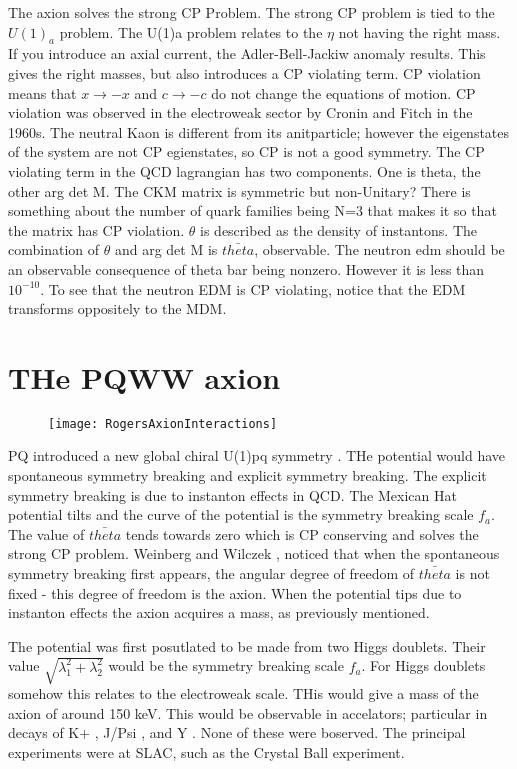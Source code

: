 \documentclass[12pt, twoside]{book}
\begin{document}
The axion solves the strong CP Problem.
The strong CP problem is tied to the $U(1)_a$ problem.
The U(1)a problem relates to the $\eta$ not having the right mass.
If you introduce an axial current, the Adler-Bell-Jackiw anomaly results.
This gives the right masses, but also introduces a CP violating term.
CP violation means that $x \rightarrow -x$ and $c \rightarrow -c$ do not change the equations of motion.
CP violation was observed in the electroweak sector by Cronin and Fitch in the 1960s. The neutral Kaon is different from its anitparticle; however the eigenstates of the system are not CP egienstates, so CP is not a good symmetry.
The CP violating term in the QCD lagrangian has two components. One is theta, the other arg det M. The CKM matrix is symmetric but non-Unitary? There is something about the number of quark families being N=3 that makes it so that the matrix has CP violation.
$\theta$ is described as the density of instantons.
The combination of $\theta$ and arg det M is $\bar{theta}$, observable.
The neutron edm should be an observable consequence of theta bar being nonzero.
However it is less than $10^{-10}$.
To see that the neutron EDM is CP violating, notice that the EDM transforms oppositely to the MDM. 

\section{THe PQWW axion}

\begin{figure}
\texttt{[image: RogersAxionInteractions]}
\end{figure}

PQ introduced a new global chiral U(1)pq symmetry \cite{pecceiquinn}. THe potential would have spontaneous symmetry breaking and explicit symmetry breaking. The explicit symmetry breaking is due to instanton effects in QCD. The Mexican Hat potential tilts and the curve of the potential is the symmetry breaking scale $f_a$. The value of $\bar{theta}$ tends towards zero which is CP conserving and solves the strong CP problem. Weinberg and Wilczek \cite{weinberg},\cite{wilczek} noticed that when the spontaneous symmetry breaking first appears, the angular degree of freedom of $\bar{theta}$ is not fixed - this degree of freedom is the axion. When the potential tips due to instanton effects the axion acquires a mass, as previously mentioned.

The potential was first posutlated to be made from two Higgs doublets. Their value $\sqrt{\lambda_1^2 + \lambda_2^2 }$ would be the symmetry breaking scale $f_a$. For Higgs doublets somehow this relates to the electroweak scale. THis would give a mass of the axion of around 150 keV. This would be observable in accelators; particular in decays of K+ \cite{kdecays}, J/Psi \cite{jpsidecays}, and Y \cite{upsilondecays}. None of these were boserved. The principal experiments were at SLAC, such as the Crystal Ball experiment.
\end{document}
